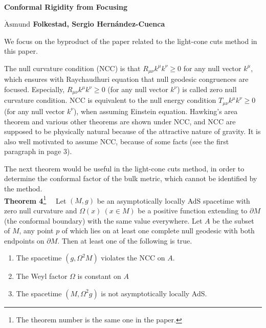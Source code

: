 \documentclass[12pt]{article}
\date{}
\renewcommand{\thefootnote}{\fnsymbol{footnote}}
\begin{document}
{\Large{}\\[2mm]
\textbf{Conformal Rigidity from Focusing\cite{Folkestad:2021kyz}
}
}

\noindent
\hfill
\textbf{$\mathring{\textrm{A}}\textrm{smund}$ Folkestad, Sergio Hern\' andez-Cuenca}%

\renewcommand{\thefootnote}{\arabic{footnote})}
\setcounter{footnote}{0}
\vspace{12pt}
We focus on the byproduct of the paper related to the light-cone cuts method \cite{Engelhardt:2016wgb,Engelhardt:2016crc,Hernandez-Cuenca:2020ppu} in this paper.

The null curvature condition (NCC) is that $R_{\mu\nu}k^\mu k^\nu \geq 0$ for any null vector $k^\mu$, which ensures with Raychaudhuri equation that null geodesic congruences are focused.
Especially, $R_{\mu\nu}k^\mu k^\nu \geq 0$ (for any null vector $k^\nu$) is called zero null curvature condition.
NCC is equivalent to the null energy condition $T_{\mu\nu}k^\mu k^\nu \geq 0$ (for any null vector $k^\nu$), when assuming Einstein equation.
Hawking's area theorem and various other theorems are shown under NCC, and NCC are supposed to be physically natural because of the attractive nature of gravity.
It is also well motivated to assume NCC, because of some facts (see the first paragraph in page 3).

The next theorem would be useful in the light-cone cuts method, in order to determine the conformal factor of the bulk metric, which cannot be identified by the method.
\\[12pt]
\textbf{Theorem 4}\footnote{
The theorem number is the same one in the paper.
}~~
Let $(M,g)$ be an asymptotically locally AdS spacetime with zero null curvature and $\Omega(x)~(x\in M)$ be a positive function extending to $\partial M$ (the conformal boundary) with the same value everywhere.
Let $A$ be the subset of $M$, any point $p$ of which lies on at least one complete null geodesic with both endpoints on $\partial M$.
Then at least one of the following is true.
\begin{enumerate}
	\item The spacetime $(g,\Omega^2M)$ violates the NCC on $A$.
	\item The Weyl factor $\Omega$ is constant on $A$
	\item The spacetime $(M,\Omega^2g)$ is not asymptotically locally AdS.
\end{enumerate}
\end{document}
